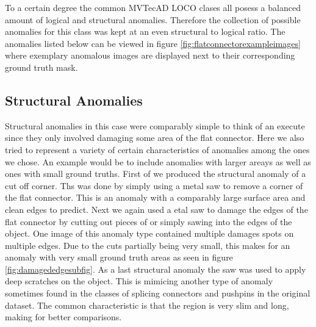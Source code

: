To a certain degree the common MVTecAD LOCO clases all posess a balanced amount of logical and structural anomalies. Therefore the collection of possible anomalies for this class was kept at an even structural 
to logical ratio. The anomalies listed below can be viewed in figure \ref{fig:flatconnectorexampleimages} where exemplary anomalous images are displayed next to their corresponding ground truth mask.

\subsection{Structural Anomalies}
Structural anomalies in this case were comparably simple to think of an execute since they only involved damaging some area of the flat connector. Here we also tried to represent a variety of 
certain characteristics of anomalies among the ones we chose. An example would be to include anomalies with larger areays as well as ones with small ground truths.\newline
First of we produced the structural anomaly of a cut off corner. Ths was done by simply using a metal saw to remove a corner of the flat connector. This is an anomaly with a comparably large 
surface area and clean edges to predict. Next we again used a etal saw to damage the edges of the flat connector by cutting out pieces of or simply sawing into the edges of the object. One image 
of this anomaly type contained multiple damages spots on multiple edges. Due to the cuts partially being very small, this makes for an anomaly with very small ground truth areas as seen in figure 
\ref{fig:damagededgesubfig}. As a last structural anomaly the saw was used to apply deep scratches on the object. This is mimicing another type of anomaly sometimes found in the classes of splicing connectors and pushpins 
in the original dataset. The common characteristic is that the region is very slim and long, making for better comparisons.

